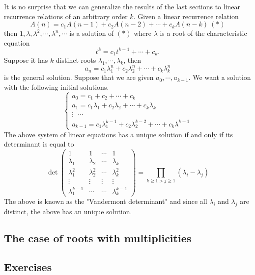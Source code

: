 It is no surprise that we can generalize the results of the last sections to linear recurrence relations of an arbitrary order $k$.
Given a linear recurrence relation
$$
A(n)=c_1A(n-1)+c_2A(n-2)+\cdots+c_kA(n-k)\ (*)
$$
then $1, \lambda, \lambda^2, \cdots, \lambda^n, \cdots$ is a solution of $(*)$ where $\lambda$ is a root of the characteristic equation
$$
t^k=c_1 t^{k-1} + \cdots + c_k.
$$
Suppose it has $k$ distinct roots $\lambda_1, \cdots, \lambda_k$, then 
$$
a_n=c_1 \lambda_1^n + c_2 \lambda_2^n + \cdots + c_k \lambda_k^n
$$
is the general solution. Suppose that we are given $a_0, \cdots, a_{k-1}$. We want a solution with the following initial solutions.
$$
\begin{cases}
    a_0 = c_1 + c_2 + \cdots + c_k\\    
    a_1 = c_1 \lambda_1 + c_2 \lambda_2 + \cdots + c_k \lambda_k\\
    \vdots \text{ } \cdots\\
    a_{k-1}= c_1 \lambda_1^{k-1} + c_2 \lambda_2^{k-2} + \cdots + c_k \lambda^{k-1}   
\end{cases}
$$
The above system of linear equations has a unique solution if and only if its determinant is equal to 
$$
\det\begin{pmatrix} 1 & 1 & \cdots & 1 
    \\ \lambda_1 & \lambda_2 & \cdots & \lambda_k \\
    \lambda_1^2 & \lambda_2^2 & \cdots & \lambda_k^2 \\
    \vdots & \vdots & \vdots & \vdots \\
    \lambda_1^{k-1} & \cdots & \cdots & \lambda_k^{k-1}  
\end{pmatrix} 
= \prod_{k \geq 1 > j \geq 1} (\lambda_i - \lambda_j)
$$
The above is known as the "Vandermont determinant" and since all $\lambda_i$ and $\lambda_j$ are distinct, the above has an unique solution.

\subsection{The case of roots with multiplicities}

\subsection{Exercises}

